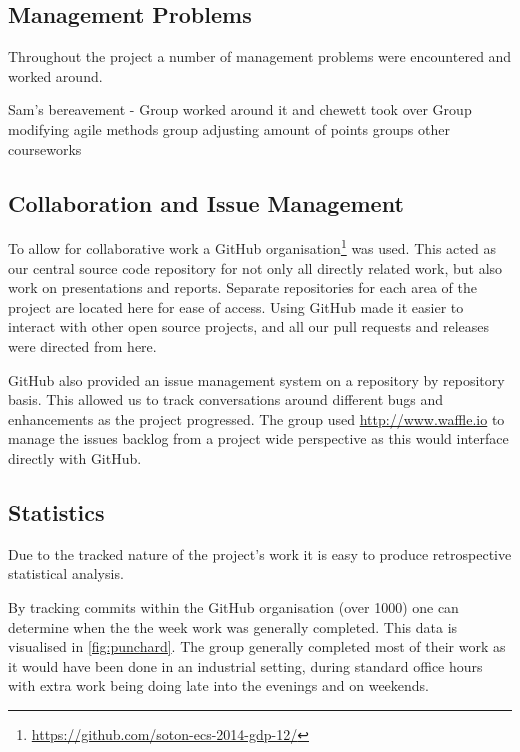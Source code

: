 \subsection{Management Problems}

Throughout the project a number of management problems were encountered and worked around.

Sam's bereavement - Group worked around it and chewett took over
Group modifying agile methods
group adjusting amount of points
groups other courseworks

\subsection{Collaboration and Issue Management}
To allow for collaborative work a GitHub organisation\footnote{\url{https://github.com/soton-ecs-2014-gdp-12/}} was used. This acted as our central source code repository for not only all directly related work, but also work on presentations and reports. Separate repositories for each area of the project are located here for ease of access. Using GitHub made it easier to interact with other open source projects, and all our pull requests and releases were directed from here. 

GitHub also provided an issue management system on a repository by repository basis. This allowed us to track conversations around different bugs and enhancements as the project progressed.
The group used \url{http://www.waffle.io} to manage the issues backlog from a project wide perspective as this would interface directly with GitHub.

\subsection{Statistics}

Due to the tracked nature of the project's work it is easy to produce retrospective statistical analysis.

By tracking commits within the GitHub organisation (over 1000) one can determine when the the week work was generally completed. This data is visualised in \autoref{fig:punchard}. The group generally completed most of their work as it would have been done in an industrial setting, during standard office hours with extra work being doing late into the evenings and on weekends.

